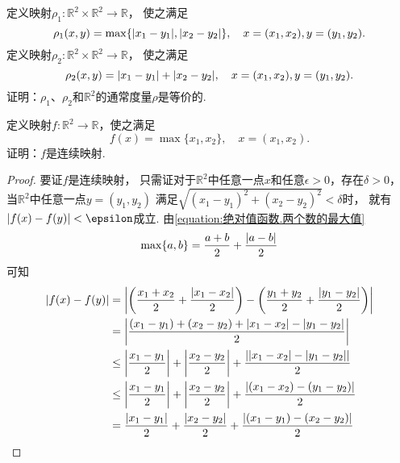 \begin{example}
定义映射\(\rho_1\colon \mathbb{R}^2 \times \mathbb{R}^2 \to \mathbb{R}\)，
使之满足\begin{equation*}
	\rho_1(x,y) = \max\{ \abs{x_1-y_1}, \abs{x_2-y_2} \},
	\quad x=(x_1,x_2),y=(y_1,y_2).
\end{equation*}
定义映射\(\rho_2\colon \mathbb{R}^2 \times \mathbb{R}^2 \to \mathbb{R}\)，
使之满足\begin{equation*}
	\rho_2(x,y) = \abs{x_1-y_1} + \abs{x_2-y_2},
	\quad x=(x_1,x_2),y=(y_1,y_2).
\end{equation*}
证明：\(\rho_1\)、\(\rho_2\)和\(\mathbb{R}^2\)的通常度量\(\rho\)是等价的.
\end{example}

\begin{example}
定义映射\(f\colon \mathbb{R}^2 \to \mathbb{R}\)，使之满足\begin{equation*}
	f(x) = \max\{ x_1, x_2 \},
	\quad x=(x_1,x_2).
\end{equation*}
证明：\(f\)是连续映射.
\begin{proof}
要证\(f\)是连续映射，
只需证对于\(\mathbb{R}^2\)中任意一点\(x\)和任意\(\epsilon > 0\)，存在\(\delta > 0\)，
当\(\mathbb{R}^2\)中任意一点\(y = (y_1,y_2)\)
满足\(\sqrt{(x_1-y_1)^2+(x_2-y_2)^2} < \delta\)时，
就有\(\abs{f(x) - f(y)} < \epsilon\)成立.
由\cref{equation:绝对值函数.两个数的最大值} \begin{equation*}
	\max\{a,b\} = \frac{a+b}{2} + \frac{\abs{a-b}}{2}
\end{equation*}
\def\ExpandMax#1#2{\frac{#1+#2}{2} + \frac{\abs{#1-#2}}{2}}
可知\begin{align*}
	\abs{f(x) - f(y)}
	&= \abs{
		\left( \ExpandMax{x_1}{x_2} \right)
		-
		\left( \ExpandMax{y_1}{y_2} \right)
	} \\
	&= \abs{
		\frac{
			(x_1-y_1) + (x_2-y_2)
			+ \abs{x_1-x_2} - \abs{y_1-y_2}
		}{2}
	} \\
	&\leq \abs{\frac{x_1-y_1}{2}} + \abs{\frac{x_2-y_2}{2}} + \frac{\abs{\abs{x_1-x_2} - \abs{y_1-y_2}}}{2} \\
	&\leq \abs{\frac{x_1-y_1}{2}} + \abs{\frac{x_2-y_2}{2}} + \frac{\abs{(x_1-x_2)-(y_1-y_2)}}{2} \\
	&= \frac{\abs{x_1-y_1}}{2} + \frac{\abs{x_2-y_2}}{2} + \frac{\abs{(x_1-y_1)-(x_2-y_2)}}{2} \\

\end{align*}
\end{proof}
\end{example}
